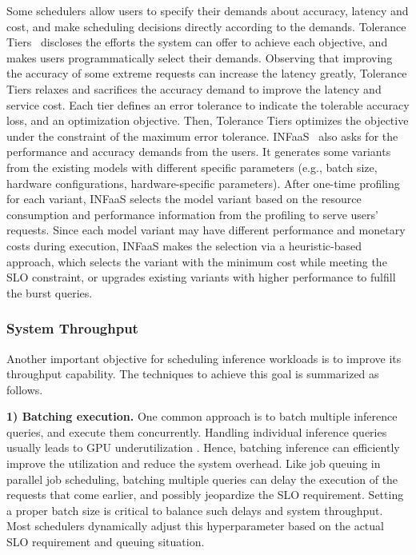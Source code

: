 Some schedulers allow users to specify their demands about accuracy, latency and cost, and make scheduling decisions directly according to the demands. Tolerance Tiers~\cite{Halpern2019onesize} discloses the efforts the system can offer to achieve each objective, and makes users programmatically select their demands. Observing that improving the accuracy of some extreme requests can increase the latency greatly, Tolerance Tiers relaxes and sacrifices the accuracy demand to improve the latency and service cost. Each tier defines an error tolerance to indicate the tolerable accuracy loss, and an optimization objective. Then, Tolerance Tiers optimizes the objective under the constraint of the maximum error tolerance. INFaaS~\cite{Neeraja2019INFaaSw,INFaaS} also asks for the performance and accuracy demands from the users.
It generates some variants from the existing models with different specific parameters (e.g., batch size, hardware configurations,  hardware-specific parameters). After one-time profiling for each variant, INFaaS selects the model variant based on the resource consumption and performance information from the profiling to serve users' requests. Since each model variant may have different performance and monetary costs during execution, INFaaS makes the selection via a heuristic-based approach, which selects the variant with the minimum cost while meeting the SLO constraint, or upgrades existing variants with higher performance to fulfill the burst queries.


\subsubsection{System Throughput}
\label{sec_throughput}

Another important objective for scheduling inference workloads is to improve its throughput capability. The techniques to achieve this goal is summarized as follows. 



\textbf{1) Batching execution.}
One common approach is to batch multiple inference queries, and execute them concurrently. Handling individual inference queries usually leads to GPU underutilization {\tiny{}}. Hence, batching inference can efficiently improve the utilization and reduce the system overhead. Like job queuing in parallel job scheduling, batching multiple queries can delay the execution of the requests that come earlier, and possibly jeopardize the SLO requirement. Setting a proper batch size is critical to balance such delays and system throughput. Most schedulers dynamically adjust this hyperparameter based on the actual SLO requirement and queuing situation.






